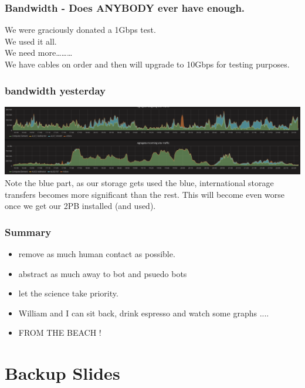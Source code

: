 \documentclass{beamer}
\begin{document}
\begin{frame}
  \frametitle{Bandwidth - Does ANYBODY ever have enough.}
  We were graciously donated a 1Gbps test.\\
  We used it all.\\
  We need more\ldots\ldots\ldots \\
  We have cables on order and then will upgrade to 10Gbps for testing purposes.
\end{frame}
\begin{frame}
    \frametitle{bandwidth yesterday}
\center    \includegraphics[scale=0.25]{Tier2Bandwidthcrop.pdf} \\ %
Note the blue part, as our storage gets used the blue, international storage transfers becomes more significant than the rest. This
will become even worse once we get our 2PB installed (and used).
\end{frame}
\begin{frame}
  \frametitle{Summary}
  \begin{itemize}
    \item<2-> remove as much human contact as possible.
    \item<3-> abstract as much away to bot and psuedo bots
    \item<4-> let the science take priority.
    \item<5-> William and I can sit back, drink espresso and watch some graphs ....
    \item<6> FROM THE BEACH !
  \end{itemize}
\end{frame}

\section{Backup Slides}
\end{document}
